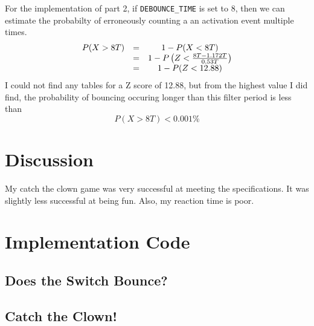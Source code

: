 \documentclass[11pt]{article}
\begin{document}
For the implementation of part 2, if \texttt{DEBOUNCE\_TIME} is set to 8,
then we can estimate the probabilty of erroneously counting a an activation
event multiple times.
\begin{equation*}
\begin{array}{c c c}
P(X>8T)	&=	&1-P(X<8T)	\\
&=&	1-P\left(Z<\frac{8T-1.172T}{0.53T}\right)	\\
&=&	1-P(Z<12.88)	\\
\end{array}
\end{equation*}
I could not find any tables for a Z score of 12.88, but from the highest
value I did find, the probability of bouncing occuring longer than this filter
period is less than
\begin{equation}
P(X>8T)<0.001\%
\end{equation}

\section{Discussion}

My catch the clown game was very successful at meeting the specifications.
It was slightly less successful at being fun. Also, my reaction time is poor.

\clearpage

\section{Implementation Code}

\subsection{Does the Switch Bounce?}
\label{debounce-time-code}


\clearpage
\subsection{Catch the Clown!}
\label{part-2-code}

\end{document}
